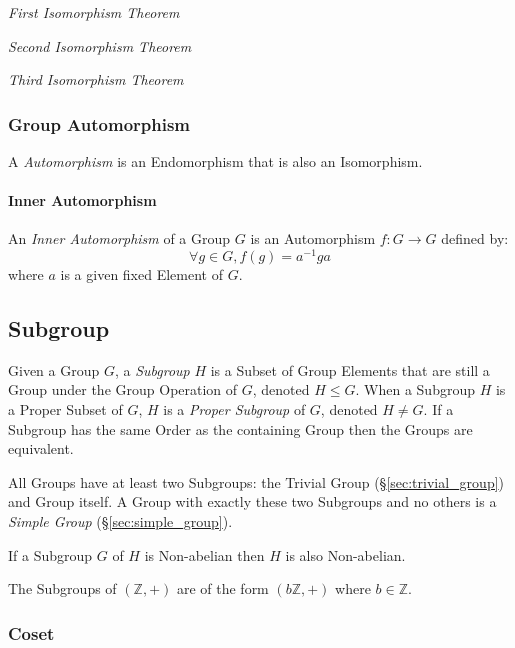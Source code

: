 \emph{First Isomorphism Theorem}

\emph{Second Isomorphism Theorem}

\emph{Third Isomorphism Theorem}



\subsubsection{Group Automorphism}\label{sec:group_automorphism}

A \emph{Automorphism} is an Endomorphism that is also an Isomorphism.



\paragraph{Inner Automorphism}\label{sec:inner_automorphism}\hfill

An \emph{Inner Automorphism} of a Group $G$ is an Automorphism $f : G
\rightarrow G$ defined by:
\[
    \forall g \in G, f(g) = a^{-1}ga
\]
where $a$ is a given fixed Element of $G$.



\subsection{Subgroup}\label{sec:subgroup}

Given a Group $G$, a \emph{Subgroup} $H$ is a Subset of Group Elements
that are still a Group under the Group Operation of $G$, denoted $H
\leq G$. When a Subgroup $H$ is a Proper Subset of $G$, $H$ is a
\emph{Proper Subgroup} of $G$, denoted $H \neq G$. If a Subgroup has
the same Order as the containing Group then the Groups are equivalent.

All Groups have at least two Subgroups: the Trivial Group
(\S\ref{sec:trivial_group}) and Group itself. A Group with exactly
these two Subgroups and no others is a \emph{Simple Group}
(\S\ref{sec:simple_group}).

If a Subgroup $G$ of $H$ is Non-abelian then $H$ is also Non-abelian.

The Subgroups of $(\mathbb{Z},+)$ are of the form $(b\mathbb{Z},+)$
where $b \in \mathbb{Z}$.



\subsubsection{Coset}\label{sec:coset}

